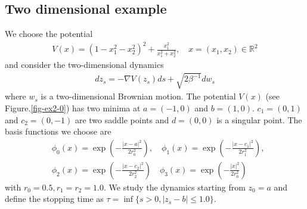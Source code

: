 \documentclass[final]{siamltex}
\begin{document}
\subsection{Two dimensional example}
We choose the potential 
\begin{align}
V(x) = (1 - x_1^2 - x_2^2)^2 + \frac{x_1^2}{x_1^2 + x_2^2}, \quad x = (x_1,x_2) \in \mathbb{R}^2
\end{align}
and consider the two-dimensional dynamics
\begin{align}
  dz_s = - \nabla V(z_s) ds + \sqrt{2\beta^{-1}} dw_s
\end{align}
where $w_s$ is a two-dimensional Brownian motion.
The potential $V(x)$ (see Figure.\ref{fig-ex2-0}) has two minima at $a = (-1, 0)$ and $b = (1,0)$.
$c_1 = (0, 1)$ and $c_2 = (0,-1)$ are two saddle points and $d=(0,0)$ is a
singular point. The basis functions we choose are 
\begin{align}
  & \phi_0(x) = \exp(-\frac{|x - a|^2}{2r_0^2}), \quad \phi_1(x) = \exp(-\frac{|x - c_1|^2}{2r_1^2}), \\
  & \phi_2(x) = \exp(-\frac{|x - c_2|^2}{2r_2^2}) \quad \phi_3(x) = \exp(-\frac{|x|^2}{2r_0^2}) 
\end{align}
with $r_0 = 0.5, r_1 = r_2 = 1.0$. We study the dynamics starting from $z_0 =
a$ and define the stopping time as $\tau = \inf\{s > 0, |z_s - b| \le 1.0\}$.
\end{document}
